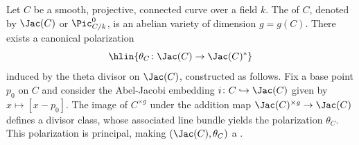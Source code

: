 \begin{definition} \label{definition:canonical_principal_polarization_of_a_jacobian}
    Let $C$ be a smooth, projective, connected curve over a field $k$. The  of $C$, denoted by $\Jac(C)$ or $\Pic^0_{C/k}$, is an abelian variety of dimension $g = g(C)$. There exists a canonical polarization
    $$\hlin{\theta_C\colon \Jac(C) \to \Jac(C)^*}$$
    induced by the theta divisor on $\Jac(C)$, constructed as follows. Fix a base point $p_0$ on $C$ and consider the Abel-Jacobi embedding $i\colon C \hookrightarrow \Jac(C)$ given by $x \mapsto [x - p_0]$. The image of $C^{\times g}$ under the addition map $\Jac(C)^{\times g} \to \Jac(C)$ defines a divisor class, whose associated line bundle yields the polarization $\theta_C$. This polarization is principal, making $(\Jac(C), \theta_C)$ a .
\end{definition}
